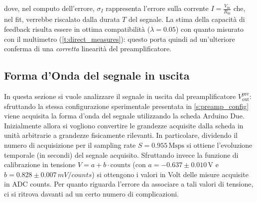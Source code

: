 \documentclass[a4paper,11pt]{article} %
\begin{document}
\noindent dove, nel computo dell'errore, $\sigma_I$ rappresenta l'errore sulla corrente $I =
\frac{V_{\text{in}}}{R_{\text{in}}}$ che, nel fit, verrebbe riscalato dalla durata $T$ del segnale. La stima della
capacità di feedback risulta essere in ottima compatibilità ($\lambda = 0.05$) con quanto misurato con il multimetro
(\autoref{t:direct_measures}): questo porta quindi ad un'ulteriore conferma di una \textit{corretta} linearità del
preamplificatore.


\subsection{Forma d'Onda del segnale in uscita}\label{s:preamp_waveform}

In questa sezione si vuole analizzare il segnale in uscita dal preamplificatore $V^{\text{pre}}_{\text{out}}$:
sfruttando la stessa configurazione sperimentale presentata in \autoref{s:preamp_config} viene acquisita la forma d'onda
del segnale utilizzando la scheda Arduino Due. Inizialmente allora si vogliono convertire le grandezze acquisite dalla
scheda in unità arbitrarie a grandezze fisicamente rilevanti. In particolare, dividendo il numero di acquisizione per il
sampling rate $S=0.955\,\text{Msps}$ si ottiene l'evoluzione temporale (in secondi) del segnale acquisito. Sfruttando
invece la funzione di calibrazione in tensione $V= a  +  b \cdot \text{counts}$ (con $a=-0.637 \pm 0.010\,\si{\volt}$ e
$b=0.828\pm0.007\,\si{mV/counts}$) si ottengono i valori in Volt delle misure acquisite in ADC counts. Per quanto
riguarda l'errore da associare a tali valori di tensione, ci si ritrova davanti ad un certo numero di complicazioni. 


\end{document}

